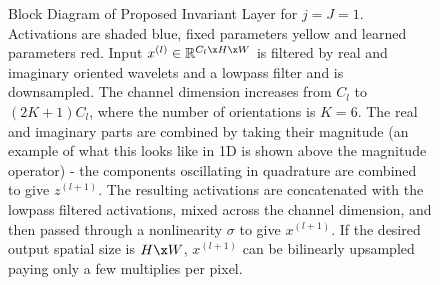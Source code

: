 \begin{figure}[t!]
{

  }
  \caption{Block Diagram of Proposed Invariant Layer for $j=J=1$. Activations are shaded
  blue, fixed parameters yellow and learned parameters red. Input
  $x^{(l)}\in \mathbb{R}^{C_l\x H\x W}$ is filtered by real and imaginary oriented
  wavelets and a lowpass filter and is downsampled. The channel dimension
  increases from $C_l$ to $(2K+1)C_l$, where the number of orientations is $K=6$.
  The real and imaginary parts are combined by taking their magnitude (an
  example of what this looks like in 1D is shown above the magnitude operator) -
  the components oscillating in quadrature are combined to give $z^{(l+1)}$. The
  resulting activations are concatenated with the lowpass filtered activations,
  mixed across the channel dimension, and then passed through a nonlinearity
  $\sigma$ to give $x^{(l+1)}$.  If the desired output spatial size is $H\x W$,
  $x^{(l+1)}$ can be bilinearly upsampled paying only a few multiplies per
  pixel.}
  \label{fig:block_diagram}
\end{figure}


